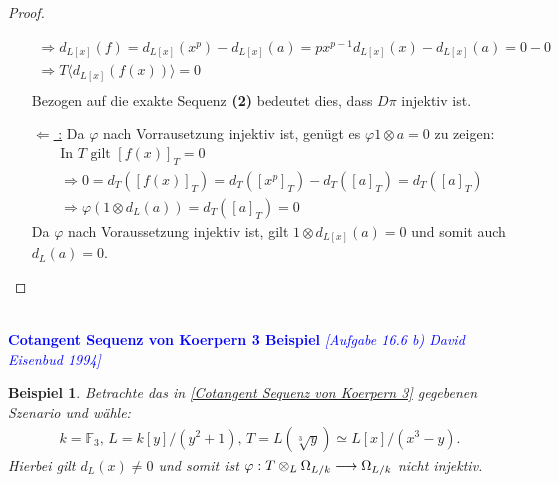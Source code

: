 \documentclass[10pt,a4paper]{report}
\newcommand{\comment}[1]{}
\newcommand{\ModulsOfDifferenzials}{David Eisenbud 1994}
\newcounter{Aussage}[chapter]
\newtheorem{bsp}[Aussage]{Beispiel}
\newcommand{\functionfront}[3]{\nolinebreak{#1:#2 \longrightarrow #3}}
\newcommand{\divR}[2]{\Omega_{#1/#2}}
\newcommand{\divf}[1]{d_{#1}}
\newcommand{\Tensor}[3]{#1 \otimes_{#2} #3}
\newcommand{\tensor}[3]{#1 \otimes #3}
\newcommand{\Verz}[1]{\langle #1 \rangle}
\begin{document}
\begin{proof}
\begin{itemize}
\begin{gather*}
\Rightarrow d_{L[x]}(f) = d_{L[x]}(x^p) - d_{L[x]}(a) =  px^{p-1}d_{L[x]}(x) - d_{L[x]}(a) = 0 - 0 \\
\Rightarrow T\Verz{\divf{L[x]}(f(x))} = 0\\
\end{gather*}
Bezogen auf die exakte Sequenz \textbf{(2)} bedeutet dies, dass $D \pi$ injektiv ist.
\item[\underline{\glqq $\Leftarrow$ \grqq:}]
Da $\varphi$ nach Vorrausetzung injektiv ist, genügt es $\varphi{\tensor{1}{L}{a}} = 0$ zu zeigen:
\begin{gather*}
\text{In $T$ gilt } [f(x)]_{T} = 0 \\
\Rightarrow 0 = \divf{T}([f(x)]_T) = \divf{T}([x^p]_T) - \divf{T}([a]_T) = \divf{T}([a]_T) \\
\Rightarrow \varphi(\tensor{1}{L}{d_{L}(a)}) = \divf{T}([a]_T) = 0 
\end{gather*}
Da $\varphi$  nach Voraussetzung injektiv ist, gilt $\tensor{1}{L[x]}{\divf{L[x]}(a)} = 0$ und somit auch $\divf{L}(a) = 0$.
\end{itemize}
\end{proof}


\ \\
\textcolor{blue}{\textbf{Cotangent Sequenz von Koerpern 3 Beispiel} \textit{[Aufgabe 16.6 b) \ModulsOfDifferenzials]}}
\begin{bsp}\comment{\label{Cotangent Sequenz von Koerpern 3 Beispiel}}
\comment{bin mir nicht sicher, ob $T \supset L$ pur inseperabel ist, bzw. ob dies für \texit{Cotangent Sequenz von Koerpern 3} überhaupt notwendig ist.}
Betrachte das in \cref{Cotangent Sequenz von Koerpern 3} gegebenen Szenario und wähle:
\begin{gather*}
k = \mathbb{F}_3, \, L = k[y]/(y^2 + 1) , \, T = L(\sqrt[3]{y}) \simeq L[x]/(x^3 - y).
\end{gather*}
Hierbei gilt $d_{L}(x) \neq 0$ und somit ist $\functionfront{\varphi}{\Tensor{T}{L}{\divR{L}{k}}}{\divR{L}{k}}$ nicht injektiv.
\end{bsp}
\end{document}
